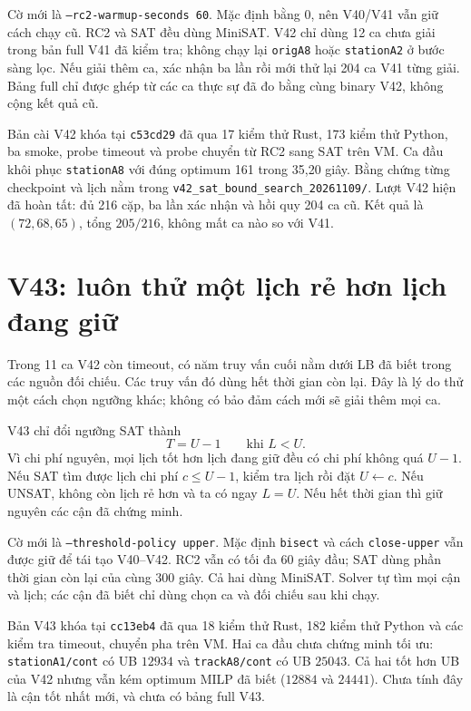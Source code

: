 \documentclass[11pt,a4paper]{article}
\newcommand{\code}[1]{\texttt{#1}}
\newcommand{\file}[1]{\nolinkurl{#1}}
\begin{document}
Cờ mới là \code{--rc2-warmup-seconds 60}. Mặc định bằng $0$, nên V40/V41
vẫn giữ cách chạy cũ. RC2 và SAT đều dùng MiniSAT. V42 chỉ dùng 12 ca
chưa giải trong bản full V41 đã kiểm tra; không chạy lại
\code{origA8} hoặc \code{stationA2} ở bước sàng lọc. Nếu giải thêm ca,
xác nhận ba lần rồi mới thử lại 204 ca V41 từng giải. Bảng full chỉ được
ghép từ các ca thực sự đã đo bằng cùng binary V42, không cộng kết quả cũ.

Bản cài V42 khóa tại \code{c53cd29} đã qua 17 kiểm thử Rust, 173 kiểm
thử Python, ba smoke, probe timeout và probe chuyển từ RC2 sang SAT trên
VM. Ca đầu khôi phục \code{stationA8} với đúng optimum 161 trong
35,20 giây. Bằng chứng từng checkpoint và lịch nằm trong
\file{v42\_sat\_bound\_search\_20261109/}. Lượt V42 hiện đã hoàn tất:
đủ 216 cặp, ba lần xác nhận và hồi quy 204 ca cũ. Kết quả là
$(72,68,65)$, tổng $205/216$, không mất ca nào so với V41.

\section{V43: luôn thử một lịch rẻ hơn lịch đang giữ}

Trong 11 ca V42 còn timeout, có năm truy vấn cuối nằm dưới LB đã biết
trong các nguồn đối chiếu. Các truy vấn đó dùng hết thời gian còn lại.
Đây là lý do thử một cách chọn ngưỡng khác; không có bảo đảm cách mới
sẽ giải thêm mọi ca.

V43 chỉ đổi ngưỡng SAT thành
\[
 T=U-1\qquad\text{khi }L<U.
\]
Vì chi phí nguyên, mọi lịch tốt hơn lịch đang giữ đều có chi phí không
quá $U-1$. Nếu SAT tìm được lịch chi phí $c\le U-1$, kiểm tra lịch rồi
đặt $U\leftarrow c$. Nếu UNSAT, không còn lịch rẻ hơn và ta có ngay
$L=U$. Nếu hết thời gian thì giữ nguyên các cận đã chứng minh.

Cờ mới là \code{--threshold-policy upper}. Mặc định \code{bisect} và
cách \code{close-upper} vẫn được giữ để tái tạo V40--V42. RC2 vẫn có tối
đa 60 giây đầu; SAT dùng phần thời gian còn lại của cùng 300 giây.
Cả hai dùng MiniSAT. Solver tự tìm mọi cận và lịch; các cận đã biết chỉ
dùng chọn ca và đối chiếu sau khi chạy.

Bản V43 khóa tại \code{cc13eb4} đã qua 18 kiểm thử Rust, 182 kiểm thử
Python và các kiểm tra timeout, chuyển pha trên VM. Hai ca đầu chưa
chứng minh tối ưu: \code{stationA1/cont} có UB $12934$ và
\code{trackA8/cont} có UB $25043$. Cả hai tốt hơn UB của V42 nhưng vẫn
kém optimum MILP đã biết ($12884$ và $24441$). Chưa tính đây là cận tốt
nhất mới, và chưa có bảng full V43.
\end{document}
